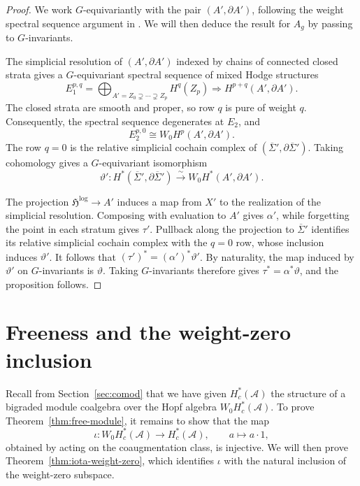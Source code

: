 \documentclass[12 pt]{amsart}
\newcommand{\fH}{\mathfrak H}
\newcommand{\cA}{\mathcal{A}}
\newcommand{\<}{\langle}
\renewcommand{\>}{\rangle}
\theoremstyle{definition}
\begin{document}
\begin{proof}
We work $G$-equivariantly with the pair $(A',\partial A')$, following the weight spectral sequence argument in \cite[Proposition~4.3]{HainautPetersen}. We will then deduce the result for $A_g$ by passing to $G$-invariants.

The simplicial resolution of $(A',\partial A')$ indexed by chains of connected closed strata gives a $G$-equivariant spectral sequence of mixed Hodge structures \cite[\S3]{PetersenStratified}
\[
E_1^{p,q}=\bigoplus_{A'=Z_0\supsetneq\cdots\supsetneq Z_p}H^q(Z_p)\Longrightarrow H^{p+q}(A',\partial A').
\]
The closed strata are smooth and proper, so row $q$ is pure of weight $q$. Consequently, the spectral sequence degenerates at $E_2$, and
\[
E_2^{p,0}\cong W_0H^p(A',\partial A').
\]
The row $q=0$ is the relative simplicial cochain complex of $(\overline\Sigma',\partial\overline\Sigma')$. Taking cohomology gives a $G$-equivariant isomorphism
\[
\vartheta'\colon H^*(\overline\Sigma',\partial\overline\Sigma')\xrightarrow{\sim}W_0H^*(A',\partial A').
\]

The projection $\fH^{\log} \to A'$ induces a map from $X'$ to the realization of the simplicial resolution. Composing with evaluation to $A'$ gives $\alpha'$, while forgetting the point in each stratum gives $\tau'$. Pullback along the projection to $\overline\Sigma'$ identifies its relative simplicial cochain complex with the $q=0$ row, whose inclusion induces $\vartheta'$. It follows that $(\tau')^* = (\alpha')^* \vartheta'$. By naturality, the map induced by $\vartheta'$ on $G$-invariants is $\vartheta$. Taking $G$-invariants therefore gives $\tau^* = \alpha^* \vartheta$, and the proposition follows.
\end{proof}

\section{Freeness and the weight-zero inclusion}\label{sec:injectivity}


Recall from Section~\ref{sec:comod} that we have given $H_c^*(\cA)$ the structure of a bigraded module coalgebra over the Hopf algebra $W_0 H_c^*(\cA)$. To prove Theorem~\ref{thm:free-module}, it remains to show that the map
\[
\iota \colon W_0 H_c^*(\cA) \longrightarrow H_c^*(\cA), \qquad a \longmapsto a \cdot 1,
\]
obtained by acting on the coaugmentation class, is injective. We will then prove Theorem~\ref{thm:iota-weight-zero}, which identifies $\iota$ with the natural inclusion of the weight-zero subspace.
\end{document}
